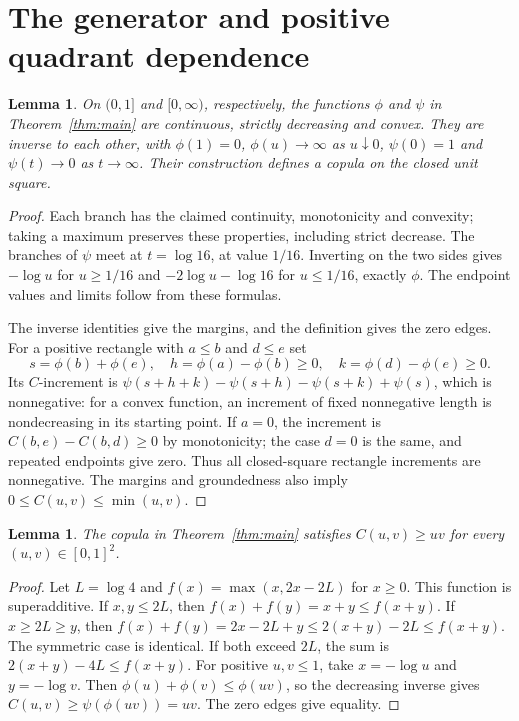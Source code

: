 \documentclass[11pt]{article}
\newtheorem{lemma}[theorem]{Lemma}
\begin{document}
\section{The generator and positive quadrant dependence}
\begin{lemma}\label{lem:gen}
On $(0,1]$ and $[0,\infty)$, respectively, the functions $\phi$ and $\psi$
in Theorem~\ref{thm:main} are continuous, strictly decreasing and convex. They are inverse to each other,
with $\phi(1)=0$, $\phi(u)\to\infty$ as $u\downarrow0$,
$\psi(0)=1$ and $\psi(t)\to0$ as $t\to\infty$.
Their construction defines a copula on the closed unit square.
\end{lemma}
\begin{proof}
Each branch has the claimed continuity, monotonicity and convexity;
taking a maximum preserves these properties, including strict decrease.
The branches of $\psi$ meet at $t=\log16$, at value $1/16$.
Inverting on the two sides gives $-\log u$ for $u\geq1/16$ and
$-2\log u-\log16$ for $u\leq1/16$, exactly $\phi$.
The endpoint values and limits follow from these formulas.

The inverse identities give the margins, and the definition gives the
zero edges. For a positive rectangle with $a\leq b$ and $d\leq e$ set
\[
 s=\phi(b)+\phi(e),\quad h=\phi(a)-\phi(b)\geq0,\quad
 k=\phi(d)-\phi(e)\geq0.
\]
Its $C$-increment is
$\psi(s+h+k)-\psi(s+h)-\psi(s+k)+\psi(s)$, which is nonnegative:
for a convex function, an increment of fixed nonnegative length is
nondecreasing in its starting point. If $a=0$, the increment is
$C(b,e)-C(b,d)\geq0$ by monotonicity; the case $d=0$ is the same,
and repeated endpoints give zero. Thus all closed-square rectangle
increments are nonnegative. The margins and groundedness also imply
$0\leq C(u,v)\leq\min(u,v)$.
\end{proof}

\begin{lemma}\label{lem:pqd}
The copula in Theorem~\ref{thm:main} satisfies $C(u,v)\geq uv$ for every
$(u,v)\in[0,1]^2$.
\end{lemma}
\begin{proof}
Let $L=\log4$ and $f(x)=\max(x,2x-2L)$ for $x\geq0$.
This function is superadditive. If $x,y\leq2L$, then
$f(x)+f(y)=x+y\leq f(x+y)$. If $x\geq2L\geq y$, then
$f(x)+f(y)=2x-2L+y\leq2(x+y)-2L\leq f(x+y)$.
The symmetric case is identical. If both exceed $2L$, the sum is
$2(x+y)-4L\leq f(x+y)$.
For positive $u,v\leq1$, take $x=-\log u$ and $y=-\log v$.
Then $\phi(u)+\phi(v)\leq\phi(uv)$, so the decreasing inverse gives
$C(u,v)\geq\psi(\phi(uv))=uv$. The zero edges give equality.
\end{proof}
\end{document}
